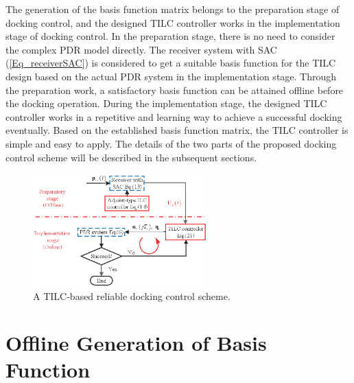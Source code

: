 The generation of the basis function matrix belongs to the preparation stage
of docking control, and the designed TILC controller works in the
implementation stage of docking control. In\textbf{ }the\textbf{ }preparation
stage, there is no need to consider the complex PDR model directly. The
receiver system with SAC (\ref{Eq_receiverSAC}) is considered to get a
suitable basis function for the TILC design based on the actual PDR system
in the implementation stage. Through the preparation work, a
satisfactory basis function can be attained offline before the docking
operation. During the implementation stage, the designed TILC
controller works in a repetitive and learning way to achieve a successful
docking eventually. Based on the established basis function matrix, the TILC
controller is simple and easy to apply. The details of the two parts of the
proposed docking control scheme will be described in the subsequent
sections.\begin{figure}[pth]
	\begin{centering}
		\includegraphics[width=0.6\textwidth]{Figures/Figs_Ch10/ControlScheme} 
		\par \end{centering}
	\caption{A TILC-based reliable docking control scheme.}%
	\label{Fig_ControlScheme}%
\end{figure}

\section{Offline Generation of Basis Function}

\label{BasisFun}

